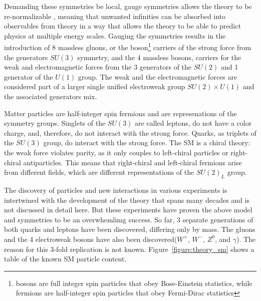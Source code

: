 Demanding these symmetries be local, gauge symmetries allows the theory to be
re-normalizable \cite{1972.tHooft-Veltman.regularization_and_renormalization}, meaning that unwanted infinities can be absorbed into
observables from theory in a way that allows the theory to be able to predict
physics at multiple energy scales.
Gauging the symmetries results in the introduction of 8 massless gluons, or the
boson\footnote{bosons are full integer spin particles that obey Bose-Einstein statistics, while fermions are half-integer spin particles that obey Fermi-Dirac statistics} carriers of the strong force \cite{1973.Gross-Wilczek.Asymptotic_freedom_0} from the generators
$SU(3)$ symmetry, and the 4 massless bosons, carriers for the weak
and electromagnetic forces from the 3 generators of the $SU(2)$ and 1
generator of the $U(1)$ group. The weak and the electromagnetic forces are considered part of a larger single 
unified electroweak group $SU(2) \times U(1)$ and the associated generators mix. 

Matter particles are half-integer spin fermions and are represenations of the symmetry groups. Singlets of the $SU(3)$ 
are called leptons, do not have a color charge, and, therefore, do not interact with the strong force. Quarks,
as triplets of the $SU(3)$ group, do interact with the strong force. The SM is a chiral theory:
the weak force violates parity, as it only couples to left-chiral particles or right-chiral antiparticles. 
This means that right-chiral and left-chiral fermions arise from different fields, which are
different representations of the $SU(2)_L$ group.
 
The discovery of particles and new interactions in various experiments
is intertwined with the development of the theory that spans many
decades and is not discussed in detail here. But these
experiments have proven the above model and symmetries to be an overwhemlimg success.
So far, 3 separate generations of both quarks and leptons have been discovered, differing only by mass. The gluons and the 4 electroweak bosons have also been discovered($W^+$, $W^-$, $Z^0$, and $\gamma$). The reason for this 3-fold replication is not known. Figure~\ref{figure:theory_sm} shows a table of the known SM particle content.  


